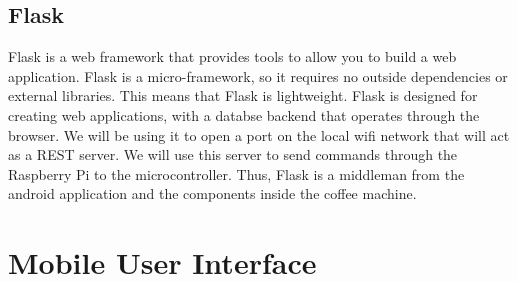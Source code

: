 \documentclass[conference]{IEEEtran}
\begin{document}
\subsection{Flask}
Flask is a web framework that provides tools to allow you to build a web application.
Flask is a micro-framework, so it requires no outside dependencies or external libraries.
This means that Flask is lightweight. Flask is designed for creating web applications,
with a databse backend that operates through the browser. We will be using it to open
a port on the local wifi network that will act as a REST server. We will use this server to send
commands through the Raspberry Pi to the microcontroller. Thus, Flask is a middleman from the 
android application and the components inside the coffee machine.

\section{Mobile User Interface}
\end{document}

